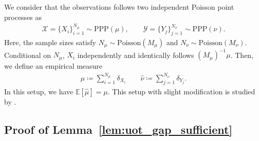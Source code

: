 \documentclass[11pt,reqno]{amsart}
\theoremstyle{definition}
\renewcommand{\hat}{\widehat}
\newcommand{\Ep}{\mathbb{E}}
\begin{document}
We consider that the observations follows two independent Poisson point processes as
\begin{align}
    \mathcal{X} = \{X_i\}_{i=1}^{N_\mu} \sim \mathrm{PPP}(\mu), \qquad \mathcal{Y} = \{Y_j\}_{j=1}^{N_\nu} \sim \mathrm{PPP}(\nu).
\end{align}
Here, the sample sizes satisfy $N_\mu \sim \mathrm{Poisson}(M_\mu)$ and $N_\nu \sim \mathrm{Poisson}(M_\nu)$.
Conditional on $N_\mu$, $X_i$ independently and identically follows $(M_\mu)^{-1}\mu$.
Then, we define an empirical measure
\begin{align}
    \hat{\mu} \coloneqq \sum_{i=1}^{ N_\mu} \delta_{X_i} \qquad \hat{\nu} \coloneqq \sum_{j=1}^{N_\nu} \delta_{Y_j}.
\end{align}
In this setup, we have $\Ep[\hat{\mu}] = \mu$. This setup with slight modification is studied by \cite{struleva2025sharp}.



\subsection{Proof of Lemma~\ref{lem:uot_gap_sufficient}} \label{sec:uot_gap}
\end{document}
